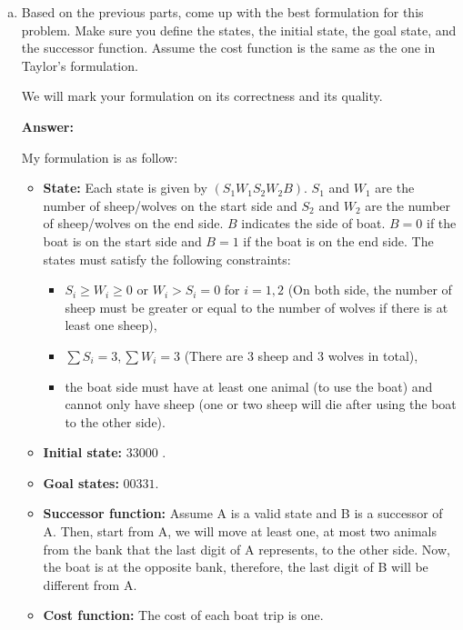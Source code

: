 \documentclass[12pt]{article}
\begin{document}
\begin{enumerate}[(a)]
\item
\label{mc_part_formulation_improved}

Based on the previous parts, come up with the best formulation for this problem. Make sure you define the states, the initial state, the goal state, and the successor function. Assume the cost function is the same as the one in Taylor's formulation. 

We will mark your formulation on its correctness and its quality.

{\bf Answer:}

My formulation is as follow:

\begin{itemize}
\item
{\bf State:} Each state is given by $(S_1 W_1 S_2 W_2 B)$. $S_1$ and $W_1$ are the number of sheep/wolves on the start side and $S_2$ and $W_2$ are the number of sheep/wolves on the end side. $B$ indicates the side of boat. $B = 0$ if the boat is on the start side and $B = 1$ if the boat is on the end side. The states must satisfy the following constraints: 
\begin{itemize}
\item $S_i \geq W_i \geq 0$ or $W_i > S_i = 0$ for $i = 1, 2$ (On both side, the number of sheep must be greater or equal to the number of wolves if there is at least one sheep), 
\item $\sum{S_i} = 3, \sum{W_i} = 3$ (There are 3 sheep and 3 wolves in total),
\item the boat side must have at least one animal (to use the boat) and cannot only have sheep (one or two sheep will die after using the boat to the other side).
\end{itemize}

\item
{\bf Initial state:} $33000$ .

\item
{\bf Goal states:} $00331$.

\item
{\bf Successor function:} Assume A is a valid state and B is a successor of A. Then, start from A, we will move at least one, at most two animals from the bank that the last digit of A represents, to the other side. Now, the boat is at the opposite bank, therefore, the last digit of B will be different from A.

\item
{\bf Cost function:} The cost of each boat trip is one.
\end{itemize}




\end{enumerate}
\end{document}
